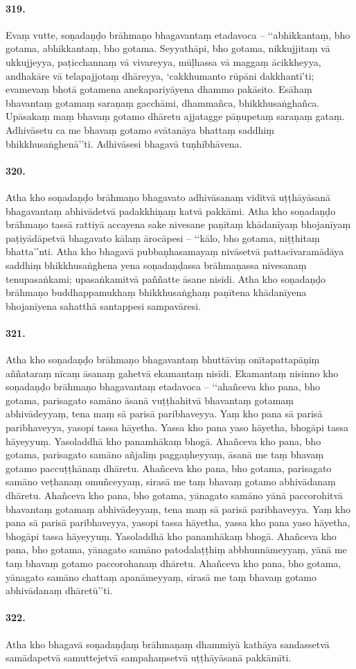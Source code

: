 \paragraph{319.} Evaṃ vutte, soṇadaṇḍo brāhmaṇo bhagavantaṃ etadavoca – ‘‘abhikkantaṃ, bho gotama, abhikkantaṃ, bho gotama. Seyyathāpi, bho gotama, nikkujjitaṃ vā ukkujjeyya, paṭicchannaṃ vā vivareyya, mūḷhassa vā maggaṃ ācikkheyya, andhakāre vā telapajjotaṃ dhāreyya, ‘cakkhumanto rūpāni dakkhantī’ti; evamevaṃ bhotā gotamena anekapariyāyena dhammo pakāsito. Esāhaṃ bhavantaṃ gotamaṃ saraṇaṃ gacchāmi, dhammañca, bhikkhusaṅghañca. Upāsakaṃ maṃ bhavaṃ gotamo dhāretu ajjatagge pāṇupetaṃ saraṇaṃ gataṃ. Adhivāsetu ca me bhavaṃ gotamo svātanāya bhattaṃ saddhiṃ bhikkhusaṅghenā’’ti. Adhivāsesi bhagavā tuṇhībhāvena.

\paragraph{320.} Atha kho soṇadaṇḍo brāhmaṇo bhagavato adhivāsanaṃ viditvā uṭṭhāyāsanā bhagavantaṃ abhivādetvā padakkhiṇaṃ katvā pakkāmi. Atha kho soṇadaṇḍo brāhmaṇo tassā rattiyā accayena sake nivesane paṇītaṃ khādanīyaṃ bhojanīyaṃ paṭiyādāpetvā bhagavato kālaṃ ārocāpesi – ‘‘kālo, bho gotama, niṭṭhitaṃ bhatta’’nti. Atha kho bhagavā pubbaṇhasamayaṃ nivāsetvā pattacīvaramādāya saddhiṃ bhikkhusaṅghena yena soṇadaṇḍassa brāhmaṇassa nivesanaṃ tenupasaṅkami; upasaṅkamitvā paññatte āsane nisīdi. Atha kho soṇadaṇḍo brāhmaṇo buddhappamukhaṃ bhikkhusaṅghaṃ paṇītena khādanīyena bhojanīyena sahatthā santappesi sampavāresi.

\paragraph{321.} Atha kho soṇadaṇḍo brāhmaṇo bhagavantaṃ bhuttāviṃ onītapattapāṇiṃ aññataraṃ nīcaṃ āsanaṃ gahetvā ekamantaṃ nisīdi. Ekamantaṃ nisinno kho soṇadaṇḍo brāhmaṇo bhagavantaṃ etadavoca – ‘‘ahañceva kho pana, bho gotama, parisagato samāno āsanā vuṭṭhahitvā bhavantaṃ gotamaṃ abhivādeyyaṃ, tena maṃ sā parisā paribhaveyya. Yaṃ kho pana sā parisā paribhaveyya, yasopi tassa hāyetha. Yassa kho pana yaso hāyetha, bhogāpi tassa hāyeyyuṃ. Yasoladdhā kho panamhākaṃ bhogā. Ahañceva kho pana, bho gotama, parisagato samāno añjaliṃ paggaṇheyyaṃ, āsanā me taṃ bhavaṃ gotamo paccuṭṭhānaṃ dhāretu. Ahañceva kho pana, bho gotama, parisagato samāno veṭhanaṃ omuñceyyaṃ, sirasā me taṃ bhavaṃ gotamo abhivādanaṃ dhāretu. Ahañceva kho pana, bho gotama, yānagato samāno yānā paccorohitvā bhavantaṃ gotamaṃ abhivādeyyaṃ, tena maṃ sā parisā paribhaveyya. Yaṃ kho pana sā parisā paribhaveyya, yasopi tassa hāyetha, yassa kho pana yaso hāyetha, bhogāpi tassa hāyeyyuṃ. Yasoladdhā kho panamhākaṃ bhogā. Ahañceva kho pana, bho gotama, yānagato samāno patodalaṭṭhiṃ abbhunnāmeyyaṃ, yānā me taṃ bhavaṃ gotamo paccorohanaṃ dhāretu. Ahañceva kho pana, bho gotama, yānagato samāno chattaṃ apanāmeyyaṃ, sirasā me taṃ bhavaṃ gotamo abhivādanaṃ dhāretū’’ti.

\paragraph{322.} Atha kho bhagavā soṇadaṇḍaṃ brāhmaṇaṃ dhammiyā kathāya sandassetvā samādapetvā samuttejetvā sampahaṃsetvā uṭṭhāyāsanā pakkāmīti.

